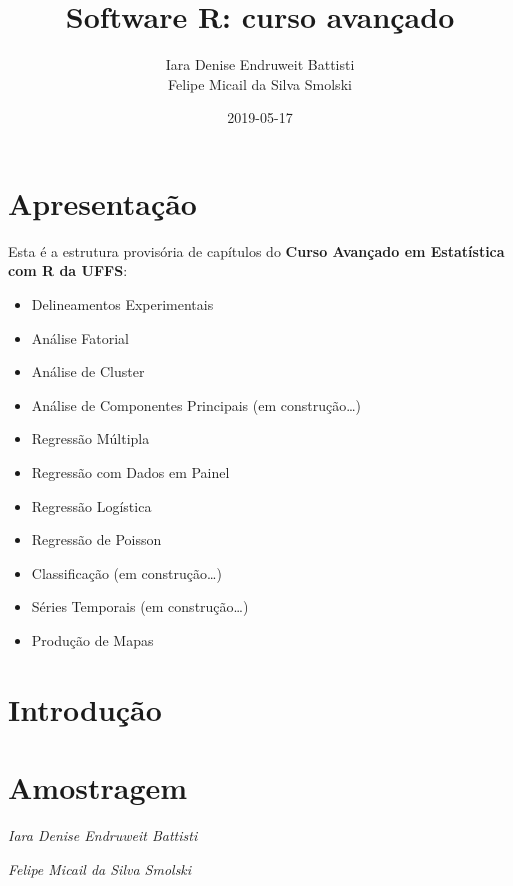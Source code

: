 \documentclass[12pt,brazil,oneside]{book}
\title{Software R: curso avançado}
\author{Iara Denise Endruweit Battisti \\ Felipe Micail da Silva Smolski}
\date{2019-05-17}
\providecommand{\tightlist}{%
  \setlength{\itemsep}{0pt}\setlength{\parskip}{0pt}}
\begin{document}
\maketitle

{
\setcounter{tocdepth}{1}
\tableofcontents
}
\hypertarget{apresentacao}{%
\chapter*{Apresentação}\label{apresentacao}}

\frenchspacing

Esta é a estrutura provisória de capítulos do \textbf{Curso Avançado em Estatística com R da UFFS}:

\begin{itemize}
\tightlist
\item
  Delineamentos Experimentais
\item
  Análise Fatorial
\item
  Análise de Cluster
\item
  Análise de Componentes Principais (em construção\ldots{})
\item
  Regressão Múltipla
\item
  Regressão com Dados em Painel
\item
  Regressão Logística
\item
  Regressão de Poisson
\item
  Classificação (em construção\ldots{})
\item
  Séries Temporais (em construção\ldots{})
\item
  Produção de Mapas
\end{itemize}

\hypertarget{introducao}{%
\chapter*{Introdução}\label{introducao}}

\hypertarget{amostragem}{%
\chapter{Amostragem}\label{amostragem}}

\emph{Iara Denise Endruweit Battisti}

\emph{Felipe Micail da Silva Smolski}

\begin{flushright}
\emph{}
\end{flushright}
\end{document}
